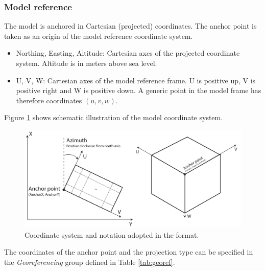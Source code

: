 \documentclass[10pt,a4paper]{article}
\begin{document}
\subsubsection{Model reference}

The model is anchored in Cartesian (projected) coordinates. The anchor point is taken as an origin of the model reference coordinate system. 

\begin{itemize}
\item Northing, Easting, Altitude: Cartesian axes of the projected coordinate system. Altitude is in meters above sea level. 

\item U, V, W: Cartesian axes of the model reference frame. U is positive up, V is positive right and W is positive down. A generic point in the model frame has therefore coordinates $(u,v,w)$.
\end{itemize}

Figure \ref{fig:reference} shows schematic illustration of the model coordinate system.

\begin{figure}
\centerline{\includegraphics[width=\textwidth]{Figs/reference.pdf}}
\caption{Coordinate system and notation adopted in the format.}
\label{fig:reference}
\end{figure}

The coordinates of the anchor point and the projection type can be specified in the \textit{Georeferencing} group defined in Table \ref{tab:georef}. 
\end{document}
